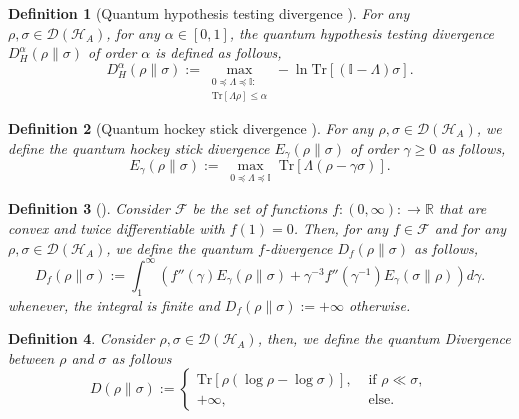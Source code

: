 \documentclass[onecolumn,ldraftcls, 11pt]{IEEEtran}
\newcommand{\tr}{\mathrm{Tr}}
\newcommand*{\bbR}{\mathbb{R}}
\newcommand*{\bbI}{\mathbb{I}}
\newcommand*{\cH}{\mathcal{H}}
\newcommand*{\cF}{\mathcal{F}}
\newcommand*{\cD}{\mathcal{D}}
\newtheorem{definition}{Definition}
\begin{document}
\begin{definition}[Quantum hypothesis testing divergence {\cite{Wang_2012}}]\label{d_hyp_func}
    For any $\rho,\sigma \in \cD(\cH_A)$, for any $\alpha \in [0,1]$, the quantum hypothesis testing divergence $D^{\alpha}_{H}{(\rho\|\sigma)}$ of order $\alpha$ is defined as follows,
    \begin{equation}
        D^{\alpha}_{H}{(\rho\|\sigma)} := \max_{\substack{0 \preceq \Lambda \preceq \bbI:\\
        \tr[\Lambda \rho] \leq \alpha}} -\ln \tr[(\bbI - \Lambda)\sigma] .\label{d_hyp_func_eq}
    \end{equation}
\end{definition}

\begin{definition}[Quantum hockey stick divergence \cite{SW12}]\label{f_sym_hyp_func}
    For any $\rho,\sigma \in \cD(\cH_A)$, we define the quantum hockey stick divergence $E_{\gamma}(\rho\|\sigma)$ of order $\gamma\geq 0$ as follows,
    \begin{equation}
        E_{\gamma}(\rho\|\sigma) := \max_{\substack{0 \preceq \Lambda \preceq \bbI}
        }\tr[\Lambda (\rho - \gamma\sigma)].\label{f_sym_hyp_func_eq}
    \end{equation}
\end{definition}

\begin{definition}[\cite{Hirche_2024}]\label{def_f_div_integral_rep}
    Consider $\cF$ be the set of functions $f : (0,\infty) : \to \bbR$ that are convex and twice differentiable with $f(1) = 0$. Then, for any $f \in \cF$ and for any $\rho,\sigma \in \cD(\cH_A)$, we define the quantum $f$-divergence $D_f(\rho\|\sigma)$ as follows,
    \begin{equation}
        D_f(\rho\|\sigma) :=  \int_{1}^{\infty}\left( f''(\gamma) E_{\gamma}(\rho\|\sigma) + \gamma^{-3} f''(\gamma^{-1}) E_{\gamma}(\sigma\|\rho)\right) d\gamma.\label{def_f_div_integral_rep_eq}
    \end{equation}
    whenever, the integral is finite and $D_{f}(\rho\|\sigma) := +\infty$ otherwise.
\end{definition}

\begin{definition}\label{def_quant_KL_div}
    Consider $\rho,\sigma \in \cD(\cH_A)$, then, we define the quantum Divergence between $\rho$ and $\sigma$ as follows
    \begin{equation*}
        D(\rho \| \sigma) := \begin{cases}
            \tr[\rho(\log\rho -\log\sigma)], &\text{  if } \rho \ll \sigma, \\
             +\infty, &\text{ else}.
        \end{cases}
    \end{equation*}
\end{definition}
\end{document}
